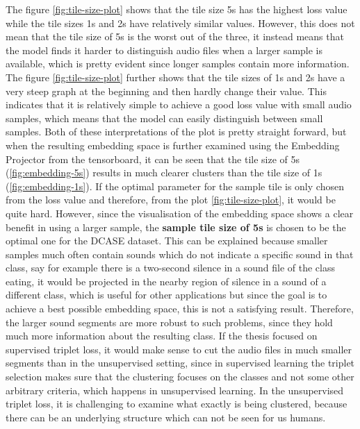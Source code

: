 \newline
\newline
The figure \ref{fig:tile-size-plot} shows that the tile size 5s has the highest loss value while the tile sizes 1s and 2s have relatively similar values. However, this does not mean that the tile size of 5s is the worst out of the three, it instead means that the model finds it harder to distinguish audio files when a larger sample is available, which is pretty evident since longer samples contain more information.
\newline
\newline
The figure \ref{fig:tile-size-plot} further shows that the tile sizes of 1s and 2s have a very steep graph at the beginning and then hardly change their value. This indicates that it is relatively simple to achieve a good loss value with small audio samples, which means that the model can easily distinguish between small samples.
\newline
\newline
Both of these interpretations of the plot is pretty straight forward, but when the resulting embedding space is further examined using the Embedding Projector from the tensorboard, it can be seen that the tile size of 5s (\ref{fig:embedding-5s}) results in much clearer clusters than the tile size of 1s (\ref{fig:embedding-1s}). 
\newline
\newline
If the optimal parameter for the sample tile is only chosen from the loss value and therefore, from the plot \ref{fig:tile-size-plot}, it would be quite hard. However, since the visualisation of the embedding space shows a clear benefit in using a larger sample, the \textbf{sample tile size of 5s} is chosen to be the optimal one for the DCASE dataset. This can be explained because smaller samples much often contain sounds which do not indicate a specific sound in that class, say for example there is a two-second silence in a sound file of the class eating, it would be projected in the nearby region of silence in a sound of a different class, which is useful for other applications but since the goal is to achieve a best possible embedding space, this is not a satisfying result. Therefore, the larger sound segments are more robust to such problems, since they hold much more information about the resulting class. 
\newline
\newline
If the thesis focused on supervised triplet loss, it would make sense to cut the audio files in much smaller segments than in the unsupervised setting, since in supervised learning the triplet selection makes sure that the clustering focuses on the classes and not some other arbitrary criteria, which happens in unsupervised learning. In the unsupervised triplet loss, it is challenging to examine what exactly is being clustered, because there can be an underlying structure which can not be seen for us humans.
